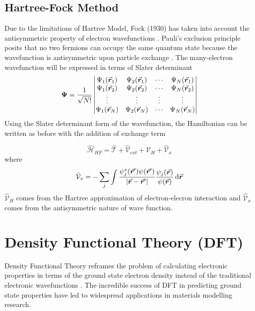 \subsection{Hartree-Fock Method}
Due to the limitations of Hartree Model, Fock (1930) has taken into account the antisymmetric property of electron wavefunctions \citep{Fock1930}. Pauli's exclusion principle posits that no two fermions can occupy the same quantum state because the wavefunction is antisymmetric upon particle exchange \citep{Pauli1925}. The many-electron wavefunction will be expressed in terms of Slater determinant \citep{Slater1929}
\begin{equation}
	\mathbf{\Psi} = \frac{1}{\sqrt{N!}} \mdet{\Psi_1({\va*{r}_1}) & \Psi_2({\va*{r}_1}) & \cdots & \Psi_N({\va*{r}_1})  \\
		\Psi_1({\va*{r}_2}) & \Psi_2({\va*{r}_2}) & \cdots & \Psi_N({\va*{r}_2})\\
		\vdots & \vdots & \vdots & \vdots \\
		\Psi_1({\va*{r}_N}) & \Psi_2({\va*{r}_N}) & \cdots & \Psi_N({\va*{r}_N})
	}
\end{equation}
Using the Slater determinant form of the wavefunction, the Hamiltonian can be written as before with the addition of exchange term

\begin{equation} \label{eq:HF_H}
	\hat{\mathcal{H}}_{HF}  = \hat{\mathcal{T}}  + \hat{\mathcal{V}}_{ext} + \hat{\mathcal{V}}_H + \hat{\mathcal{V}}_x
\end{equation}
where
\begin{equation} \label{eq:HF-ex}
	\hat{\mathcal{V}}_x = - \sum_j \int \frac{\psi_j^*(\va*{r}') \psi(\va*{r}')}{\abs{{\va*{r} - \va*{r}'}} } \frac{\psi_j(\va*{r})}{\psi(\va*{r})} \dd{\va*{r}}
\end{equation}
$\hat{\mathcal{V}}_H$ comes from the Hartree approximation of electron-elecron interaction and $\hat{\mathcal{V}}_x$ comes from the antisymmetric
nature of wave function.

\section{Density Functional Theory (DFT)}
Density Functional Theory reframes the problem of calculating electronic properties in terms of the ground state electron density instead of the traditional electronic wavefunctions \citep{Kohn1999}. The incredible success of DFT in predicting ground state properties have led to widespread applications in materials modelling research.

